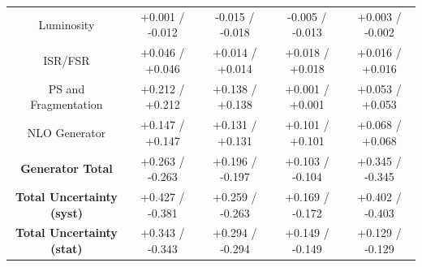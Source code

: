 \begin{table}[htbp]
\begin{center}
\begin{tabular}{|c|c|c|c|c|}
   Luminosity                            &  +0.001   / -0.012   & -0.015   / -0.018   & -0.005   / -0.013   & +0.003   / -0.002   \\
   ISR/FSR                               &  +0.046   / +0.046   & +0.014   / +0.014   & +0.018   / +0.018   & +0.016   / +0.016   \\
   PS and Fragmentation                  &  +0.212   / +0.212   & +0.138   / +0.138   & +0.001   / +0.001   & +0.053   / +0.053   \\
   NLO Generator                         &  +0.147   / +0.147   & +0.131   / +0.131   & +0.101   / +0.101   & +0.068   / +0.068   \\
   \hline
   \textbf{Generator Total}              &  +0.263   / -0.263   & +0.196   / -0.197   & +0.103   / -0.104   & +0.345   / -0.345   \\
   \hline
   \hline
   \textbf{Total Uncertainty (syst)}     &  +0.427   / -0.381   & +0.259   / -0.263   & +0.169   / -0.172   & +0.402   / -0.403   \\
   \textbf{Total Uncertainty (stat)}     &  +0.343   / -0.343   & +0.294   / -0.294   & +0.149   / -0.149   & +0.129   / -0.129   \\
   \hline
   \end{tabular}
 
   \end{center}
 \end{table}


